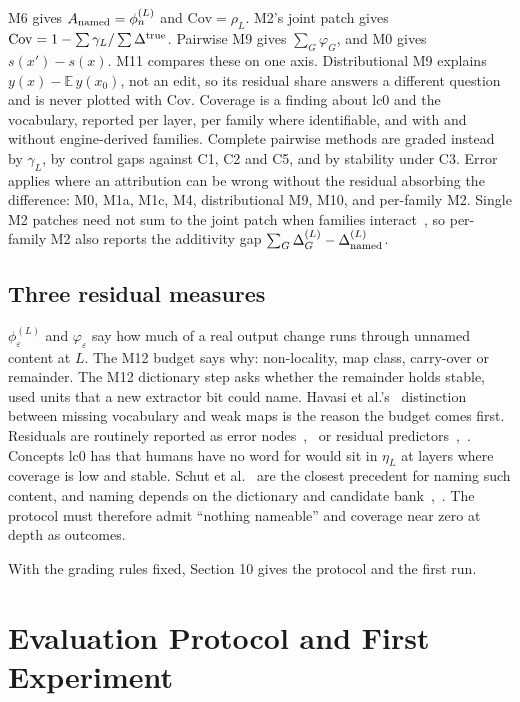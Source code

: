 \documentclass[conference]{IEEEtran}
\begin{document}
M6 gives $A_{\rm named}=\phi^{(L)}_n$ and $\mathrm{Cov}=\rho_L$. M2's joint patch gives $\mathrm{Cov}=1-\sum\gamma_L/\sum\Delta^{\rm true}$. Pairwise M9 gives $\sum_G\varphi_G$, and M0 gives $s(x')-s(x)$. M11 compares these on one axis. Distributional M9 explains $y(x)-\mathbb E\,y(x_0)$, not an edit, so its residual share answers a different question and is never plotted with Cov. Coverage is a finding about lc0 and the vocabulary, reported per layer, per family where identifiable, and with and without engine-derived families. Complete pairwise methods are graded instead by $\gamma_L$, by control gaps against C1, C2 and C5, and by stability under C3. Error applies where an attribution can be wrong without the residual absorbing the difference: M0, M1a, M1c, M4, distributional M9, M10, and per-family M2. Single M2 patches need not sum to the joint patch when families interact~\cite{heimersheim2024}, so per-family M2 also reports the additivity gap $\sum_G\Delta^{(L)}_G-\Delta^{(L)}_{\rm named}$.

\subsection{Three residual measures}\label{sec:9.4}
$\phi^{(L)}_\varepsilon$ and $\varphi_\varepsilon$ say how much of a real output change runs through unnamed content at $L$. The M12 budget says why: non-locality, map class, carry-over or remainder. The M12 dictionary step asks whether the remainder holds stable, used units that a new extractor bit could name. Havasi et al.'s~\cite{havasi2022} distinction between missing vocabulary and weak maps is the reason the budget comes first. Residuals are routinely reported as error nodes~\cite{marks2025},~\cite{ameisen2025} or residual predictors~\cite{yuksekgonul2023},~\cite{zhou2018}. Concepts lc0 has that humans have no word for would sit in $\eta_L$ at layers where coverage is low and stable. Schut et al.~\cite{schut2025} are the closest precedent for naming such content, and naming depends on the dictionary and candidate bank~\cite{leask2025},~\cite{shang2024}. The protocol must therefore admit ``nothing nameable'' and coverage near zero at depth as outcomes.

With the grading rules fixed, Section 10 gives the protocol and the first run.

\section{Evaluation Protocol and First Experiment}\label{sec:10}
\end{document}
